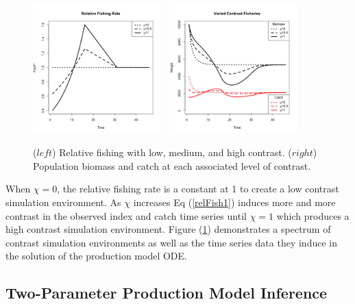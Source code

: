 %
\begin{figure}[h!]
\centering
\includegraphics[width=0.44\textwidth]{../ptNew/relFish.png}
$~$
\includegraphics[width=0.44\textwidth]{../ptNew/relSeries.png}
\caption{ \label{catchT45}
($left$) Relative fishing with low, medium, and high contrast.
($right$) Population biomass and catch at each associated level of contrast. %
}
\label{catch45}
\end{figure}
%
When $\chi=0$, the relative fishing rate is a constant at 1 to create a low
contrast simulation environment. As $\chi$ increases Eq (\ref{relFish1})
induces more and more contrast in the observed index and catch time series
until $\chi=1$ which produces a high contrast simulation environment.
Figure (\ref{catch45}) demonstrates a spectrum of contrast simulation
environments as well as the time series data they induce in the solution of
the production model ODE.

\subsection{Two-Parameter Production Model Inference\label{modelFit} }

